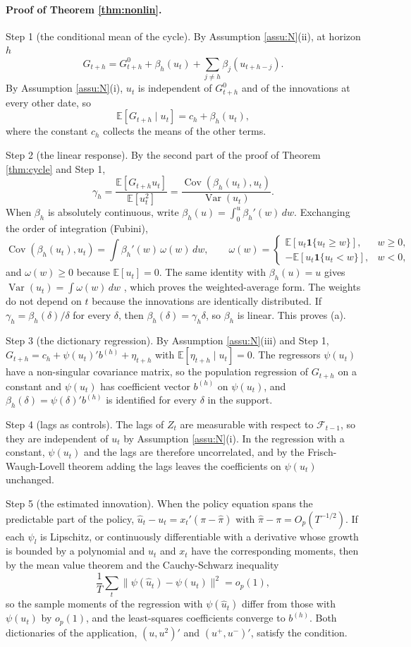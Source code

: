 \documentclass[12pt,a4paper]{article}
\theoremstyle{definition}
\newcommand{\E}{\mathbb{E}}
\newcommand{\cov}{\operatorname{Cov}}
\newcommand{\var}{\operatorname{Var}}
\begin{document}
\paragraph{Proof of Theorem \ref{thm:nonlin}.} Step 1 (the conditional mean of the cycle). By Assumption \ref{assu:N}(ii), at horizon $h$
\[
G_{t+h}=G^0_{t+h}+\beta_h(u_t)+\sum_{j\neq h}\beta_j(u_{t+h-j}) .
\]
By Assumption \ref{assu:N}(i), $u_t$ is independent of $G^0_{t+h}$ and of the innovations at every other date, so
\[
\E[G_{t+h}\mid u_t]=c_h+\beta_h(u_t),
\]
where the constant $c_h$ collects the means of the other terms.

Step 2 (the linear response). By the second part of the proof of Theorem \ref{thm:cycle} and Step 1,
\[
\gamma_h=\frac{\E[G_{t+h}u_t]}{\E[u_t^2]}=\frac{\cov(\beta_h(u_t),u_t)}{\var(u_t)} .
\]
When $\beta_h$ is absolutely continuous, write $\beta_h(u)=\int_0^u\beta_h'(w)\,dw$. Exchanging the order of integration (Fubini),
\[
\cov(\beta_h(u_t),u_t)=\int\beta_h'(w)\,\omega(w)\,dw,\qquad
\omega(w)=\begin{cases}\E[u_t\mathbf{1}\{u_t\geq w\}], & w\geq0,\\ -\E[u_t\mathbf{1}\{u_t<w\}], & w<0,\end{cases}
\]
and $\omega(w)\geq0$ because $\E[u_t]=0$. The same identity with $\beta_h(u)=u$ gives $\var(u_t)=\int\omega(w)\,dw$ \citep{Yitazaki1996}, which proves the weighted-average form. The weights do not depend on $t$ because the innovations are identically distributed. If $\gamma_h=\beta_h(\delta)/\delta$ for every $\delta$, then $\beta_h(\delta)=\gamma_h\delta$, so $\beta_h$ is linear. This proves (a).

Step 3 (the dictionary regression). By Assumption \ref{assu:N}(iii) and Step 1, $G_{t+h}=c_h+\psi(u_t)'b^{(h)}+\eta_{t+h}$ with $\E[\eta_{t+h}\mid u_t]=0$. The regressors $\psi(u_t)$ have a non-singular covariance matrix, so the population regression of $G_{t+h}$ on a constant and $\psi(u_t)$ has coefficient vector $b^{(h)}$ on $\psi(u_t)$, and $\beta_h(\delta)=\psi(\delta)'b^{(h)}$ is identified for every $\delta$ in the support.

Step 4 (lags as controls). The lags of $Z_t$ are measurable with respect to $\mathcal F_{t-1}$, so they are independent of $u_t$ by Assumption \ref{assu:N}(i). In the regression with a constant, $\psi(u_t)$ and the lags are therefore uncorrelated, and by the Frisch-Waugh-Lovell theorem adding the lags leaves the coefficients on $\psi(u_t)$ unchanged.

Step 5 (the estimated innovation). When the policy equation spans the predictable part of the policy, $\hat u_t-u_t=x_t'(\pi-\hat\pi)$ with $\hat\pi-\pi=O_p(T^{-1/2})$. If each $\psi_l$ is Lipschitz, or continuously differentiable with a derivative whose growth is bounded by a polynomial and $u_t$ and $x_t$ have the corresponding moments, then by the mean value theorem and the Cauchy-Schwarz inequality
\[
\frac1T\sum_t\big\|\psi(\hat u_t)-\psi(u_t)\big\|^2=o_p(1),
\]
so the sample moments of the regression with $\psi(\hat u_t)$ differ from those with $\psi(u_t)$ by $o_p(1)$, and the least-squares coefficients converge to $b^{(h)}$. Both dictionaries of the application, $(u,u^2)'$ and $(u^+,u^-)'$, satisfy the condition.
\end{document}
